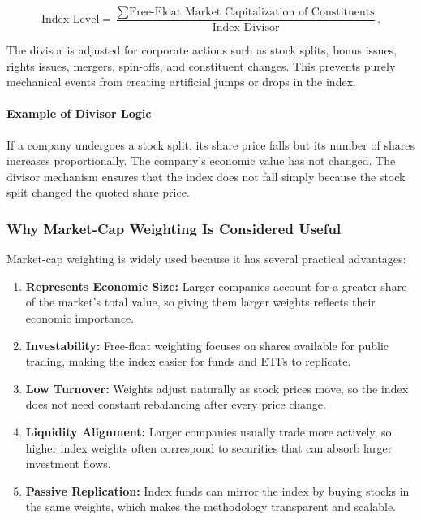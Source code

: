 \documentclass[12pt,openany]{book}
\begin{document}
\begin{equation*}
    \text{Index Level} = \frac{\sum \text{Free-Float Market Capitalization of Constituents}}{\text{Index Divisor}}.
\end{equation*}

The divisor is adjusted for corporate actions such as stock splits, bonus issues, rights issues, mergers, spin-offs, and constituent changes. This prevents purely mechanical events from creating artificial jumps or drops in the index.

\paragraph{Example of Divisor Logic}
If a company undergoes a stock split, its share price falls but its number of shares increases proportionally. The company's economic value has not changed. The divisor mechanism ensures that the index does not fall simply because the stock split changed the quoted share price.

\subsubsection{Why Market-Cap Weighting Is Considered Useful}
Market-cap weighting is widely used because it has several practical advantages:

\begin{enumerate}[leftmargin=*]
    \item \textbf{Represents Economic Size:} Larger companies account for a greater share of the market's total value, so giving them larger weights reflects their economic importance.
    \item \textbf{Investability:} Free-float weighting focuses on shares available for public trading, making the index easier for funds and ETFs to replicate.
    \item \textbf{Low Turnover:} Weights adjust naturally as stock prices move, so the index does not need constant rebalancing after every price change.
    \item \textbf{Liquidity Alignment:} Larger companies usually trade more actively, so higher index weights often correspond to securities that can absorb larger investment flows.
    \item \textbf{Passive Replication:} Index funds can mirror the index by buying stocks in the same weights, which makes the methodology transparent and scalable.
\end{enumerate}
\end{document}
